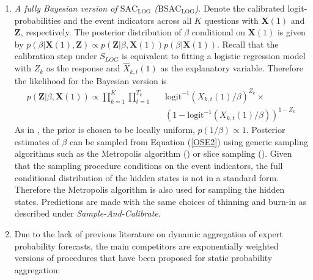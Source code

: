\documentclass[aoas, preprint]{imsart}
\numberwithin{equation}{section}
\theoremstyle{plain}
\newcommand{\logit}{\text{logit}}
\begin{document}
\begin{enumerate}
\item \textit{A fully Bayesian version of $\text{SAC}_{\text{LOG}}$ ($\text{BSAC}_{\text{LOG}}$)}. Denote the calibrated logit-probabilities and  the event indicators across all $K$ questions with $\boldsymbol{X}(1)$ and $\boldsymbol{Z}$, respectively.  The posterior distribution of $\beta$ conditional on $\boldsymbol{X}(1)$ is given by $p(\beta | \boldsymbol{X}(1), \boldsymbol{Z}) \propto p( \boldsymbol{Z} | \beta, \boldsymbol{X}(1)) p(\beta | \boldsymbol{X}(1))$. Recall that the calibration step under $S_{LOG}$ is equivalent to fitting a logistic regression model with $Z_k$ as the response and $\hat{X}_{k,t}(1)$ as the explanatory variable. Therefore the likelihood for the Bayesian version is
\begin{eqnarray}
p( \boldsymbol{Z} | \beta, \boldsymbol{X}(1)) \propto \prod_{k=1}^K \prod_{t=1}^{T_k} && \logit^{-1} \left(X_{k,t}(1)/\beta  \right)^{Z_k}\times \label{OSE2}\\ 
&& \left( 1-  \logit^{-1} \left( X_{k,t}(1)/\beta  \right) \right)^{1-Z_k} \nonumber
\end{eqnarray}
As in \citet{gelman2003bayesian}, the prior is chosen to be locally uniform, $p(1/\beta) \propto 1$. Posterior estimates of $\beta$ can be sampled from Equation (\ref{OSE2}) using generic sampling algorithms such as the Metropolis algorithm (\citet{metropolis1953equation}) or slice sampling (\citet{neal2003slice}). Given that the sampling procedure conditions on the event indicators, the full conditional distribution of the hidden states is not in a standard form. Therefore the Metropolis algorithm is also used for sampling the hidden states. Predictions are made with the same choices of thinning and burn-in as described under \textit{Sample-And-Calibrate}.


\item Due to the lack of previous literature on dynamic aggregation of expert probability forecasts,  the main competitors are exponentially weighted versions of procedures that have been proposed for static probability aggregation:

\begin{enumerate}


\end{enumerate}
\end{enumerate}
\end{document}
